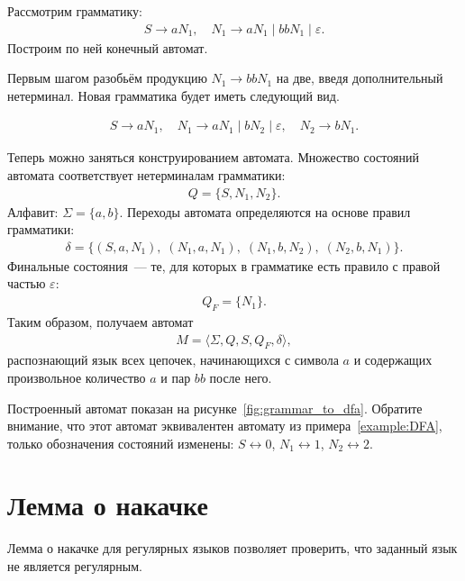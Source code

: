 \begin{example}
Рассмотрим грамматику:
\begin{align*}
    S \to a N_1, \quad
    N_1 \to a N_1 \mid b b N_1 \mid \varepsilon.
\end{align*}
Построим по ней конечный автомат.

Первым шагом разобьём продукцию $N_1 \to b b N_1$ на две, введя дополнительный нетерминал.
Новая грамматика будет иметь следующий вид.

\begin{align*}
    S \to a N_1, \quad
    N_1 \to a N_1 \mid b N_2 \mid \varepsilon , \quad
    N_2 \to b N_1.
\end{align*}

Теперь можно заняться конструированием автомата.
Множество состояний автомата соответствует нетерминалам грамматики:
\begin{align*}
    Q = \{S, N_1, N_2\}.
\end{align*}
Алфавит: $\Sigma = \{a, b\}$.
Переходы автомата определяются на основе правил грамматики:
\begin{align*}
\delta = \{
(S, a, N_1),\;
(N_1, a, N_1),\;
(N_1, b, N_2),\;
(N_2, b, N_1)
\}.
\end{align*}
Финальные состояния~--- те, для которых в грамматике есть правило с правой частью $\varepsilon$:
\begin{align*}
Q_F = \{ N_1 \}.
\end{align*}
Таким образом, получаем автомат
\begin{align*}
M = \langle \Sigma, Q, S, Q_F, \delta \rangle,
\end{align*}
распознающий язык всех цепочек, начинающихся с символа $a$ и содержащих произвольное количество $a$ и пар $bb$ после него.

Построенный автомат показан на рисунке~\ref{fig:grammar_to_dfa}. Обратите внимание, что этот автомат эквивалентен автомату из примера~\ref{example:DFA}, только обозначения состояний изменены: $S \leftrightarrow 0$, $N_1 \leftrightarrow 1$, $N_2 \leftrightarrow 2$.
\end{example}

\section{Лемма о накачке}

Лемма о накачке для регулярных языков позволяет проверить, что заданный язык не является регулярным.

